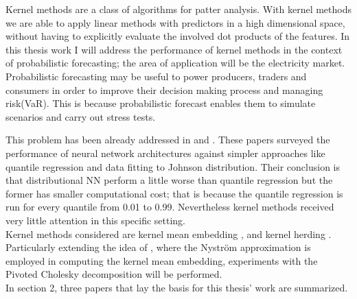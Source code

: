 

Kernel methods are a class of algorithms for patter analysis.
With kernel methods we are able to apply linear methods with predictors in a high dimensional space, without having to explicitly evaluate the involved dot products of the features.
In this thesis work I will address the performance of kernel methods in the context of probabilistic forecasting; the area of application will be the electricity market. 
Probabilistic forecasting may be useful to power producers, traders and consumers in order to improve their decision making process and managing risk(VaR). This is because probabilistic forecast enables them to simulate scenarios and carry out stress tests.


This problem has been already addressed in \cite{probablistic_electricity_forecast} and \cite{probablistic_electricity_forecast2}. 
These papers surveyed the performance of neural network architectures against simpler approaches like quantile regression and data fitting to Johnson distribution. Their conclusion is that distributional NN perform a little worse than quantile regression but the former has smaller computational cost; that is because the quantile regression is run for every quantile from 0.01 to 0.99.
Nevertheless kernel methods received very little attention in this specific setting.
\\
Kernel methods considered are kernel mean embedding \cite{pmlr}, \cite{Muandet_2017} and kernel herding \cite{supersamples}. Particularly extending the idea of \cite{2022nystrom}, where the Nyström approximation is employed in computing the kernel mean embedding, experiments with the Pivoted Cholesky decomposition will be performed.
\\
In section 2, three papers that lay the basis for this thesis’ work are summarized.
\\
